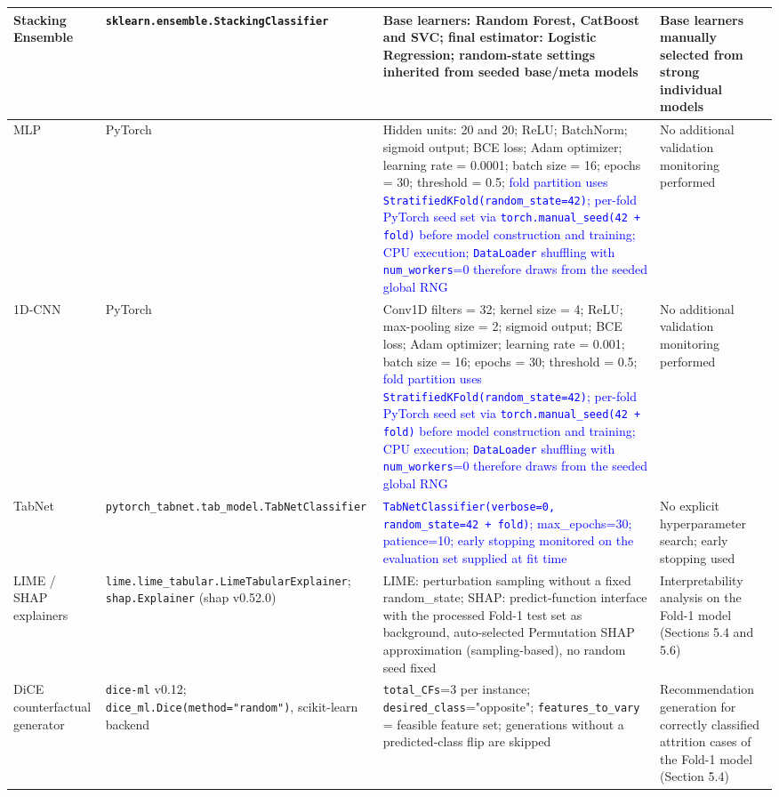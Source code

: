 \documentclass[a4paper,fleqn]{cas-sc}
\begin{document}
{\begin{longtable}{p{2cm} p{7.75cm} p{3cm} p{2.25cm}}
Stacking Ensemble 
& \texttt{sklearn.ensemble.StackingClassifier} 
& Base learners: Random Forest, CatBoost and SVC; final estimator: Logistic Regression; random-state settings inherited from seeded base/meta models 
& Base learners manually selected from strong individual models \\ 
\midrule

MLP 
& PyTorch 
& Hidden units: 20 and 20; ReLU; BatchNorm; sigmoid output; BCE loss; Adam optimizer; learning rate = 0.0001; batch size = 16; epochs = 30; threshold = 0.5; \textcolor{blue}{fold partition uses \texttt{StratifiedKFold(random\_state=42)}; per-fold PyTorch seed set via \texttt{torch.manual\_seed(42 + fold)} before model construction and training; CPU execution; \texttt{DataLoader} shuffling with \texttt{num\_workers}=0 therefore draws from the seeded global RNG} 
& No additional validation monitoring performed \\ 
\midrule

1D-CNN 
& PyTorch 
& Conv1D filters = 32; kernel size = 4; ReLU; max-pooling size = 2; sigmoid output; BCE loss; Adam optimizer; learning rate = 0.001; batch size = 16; epochs = 30; threshold = 0.5; \textcolor{blue}{fold partition uses \texttt{StratifiedKFold(random\_state=42)}; per-fold PyTorch seed set via \texttt{torch.manual\_seed(42 + fold)} before model construction and training; CPU execution; \texttt{DataLoader} shuffling with \texttt{num\_workers}=0 therefore draws from the seeded global RNG} 
& No additional validation monitoring performed \\ 
\midrule

TabNet 
& \texttt{pytorch\_tabnet.tab\_model.TabNetClassifier} 
& \textcolor{blue}{\texttt{TabNetClassifier(verbose=0, random\_state=42 + fold)}; max\_epochs=30; patience=10; early stopping monitored on the evaluation set supplied at fit time} 
& No explicit hyperparameter search; early stopping used \\ 

\midrule

LIME / SHAP explainers
& \texttt{lime.lime\_tabular.LimeTabularExplainer}; \texttt{shap.Explainer} (shap v0.52.0)
& LIME: perturbation sampling without a fixed random\_state; SHAP: predict-function interface with the processed Fold-1 test set as background, auto-selected Permutation SHAP approximation (sampling-based), no random seed fixed
& Interpretability analysis on the Fold-1 model (Sections 5.4 and 5.6) \\
\midrule

DiCE counterfactual generator
& \texttt{dice-ml} v0.12; \texttt{dice\_ml.Dice(method="random")}, scikit-learn backend
& \texttt{total\_CFs}=3 per instance; \texttt{desired\_class}="opposite"; \texttt{features\_to\_vary} = feasible feature set; generations without a predicted-class flip are skipped
& Recommendation generation for correctly classified attrition cases of the Fold-1 model (Section 5.4) \\


\end{longtable}}
\end{document}
